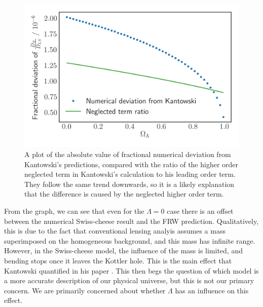 \begin{figure}
  \centering
  \includegraphics[height=0.5\linewidth]{images/flat-neglected.png}
  \caption{A plot of the absolute value of fractional numerical deviation from Kantowski's predictions, compared with the ratio of the higher order neglected term in Kantowski's calculation to his leading order term. They follow the same trend downwards, so it is a likely explanation that the difference is caused by the neglected higher order term.}
  \label{fig:flat-const-m-neglected}
\end{figure}

From the graph, we can see that even for the $\Lambda = 0$ case there is an offset between the numerical Swiss-cheese result and the FRW prediction. Qualitatively, this is due to the fact that conventional lensing analyis assumes a mass superimposed on the homogeneous background, and this mass has infinite range. However, in the Swiss-cheese model, the influence of the mass is limited, and bending stops once it leaves the Kottler hole. This is the main effect that Kantowski quantified in his paper \citet{kantowski2010gravitational}. This then begs the question of which model is a more accurate description of our physical universe, but this is not our primary concern. We are primarily concerned about whether $\Lambda$ has an influence on this effect. 


